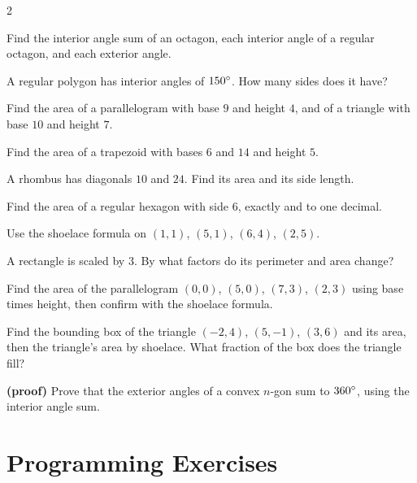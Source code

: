 \begin{multicols}{2}
\begin{exercises}
\item Find the interior angle sum of an octagon, each interior angle of a regular octagon, and each exterior angle.
\item A regular polygon has interior angles of $150^\circ$. How many sides does it have?
\item Find the area of a parallelogram with base $9$ and height $4$, and of a triangle with base $10$ and height $7$.
\item Find the area of a trapezoid with bases $6$ and $14$ and height $5$.
\item A rhombus has diagonals $10$ and $24$. Find its area and its side length.
\item Find the area of a regular hexagon with side $6$, exactly and to one decimal.
\item Use the shoelace formula on $(1, 1)$, $(5, 1)$, $(6, 4)$, $(2, 5)$.
\item A rectangle is scaled by $3$. By what factors do its perimeter and area change?
\item Find the area of the parallelogram $(0, 0)$, $(5, 0)$, $(7, 3)$, $(2, 3)$ using base times height, then confirm with the shoelace formula.
\item Find the bounding box of the triangle $(-2, 4)$, $(5, -1)$, $(3, 6)$ and its area, then the triangle's area by shoelace. What fraction of the box does the triangle fill?
\item \textbf{(proof)} Prove that the exterior angles of a convex $n$-gon sum to $360^\circ$, using the interior angle sum.
\end{exercises}
\end{multicols}

\section{Programming Exercises}

